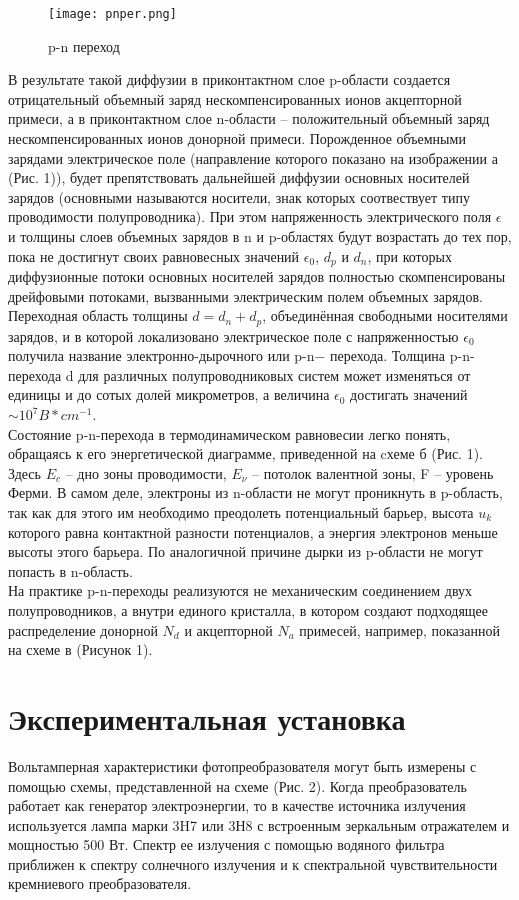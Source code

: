 \documentclass[a4paper,12pt]{article} %
\begin{document}
\begin{figure}[h]
		\centering	
		\texttt{[image: pnper.png]}
		\caption{p-n переход}
		\label{pic:scheme}
	\end{figure}

В результате такой диффузии в приконтактном слое p-области создается отрицательный объемный заряд нескомпенсированных ионов акцепторной примеси, а в приконтактном слое n-области – положительный объемный заряд нескомпенсированных ионов донорной примеси. Порожденное объемными зарядами электрическое поле (направление которого показано на изображении а (Рис. 1)), будет препятствовать дальнейшей диффузии основных носителей зарядов (основными называются носители, знак которых соотвествует типу проводимости полупроводника). При этом напряженность электрического поля $\epsilon$ и толщины слоев объемных зарядов в n и p-областях будут возрастать до тех пор, пока не достигнут своих равновесных значений $\epsilon_0$, $d_p$ и $d_n$, при которых диффузионные потоки основных носителей зарядов полностью скомпенсированы дрейфовыми потоками, вызванными электрическим полем объемных зарядов. Переходная область толщины $d=d_n+d_p$, объединённая свободными носителями зарядов, и в которой локализовано электрическое поле с напряженностью $\epsilon _0 $ получила название электронно-дырочного или p-n− перехода. Толщина p-n-перехода d для различных полупроводниковых систем может изменяться от единицы и до сотых долей микрометров, а величина $\epsilon_0$ достигать значений $\sim 10^7 B*cm^{-1}$.\\

Состояние p-n-перехода в термодинамическом равновесии легко понять, обращаясь к его энергетической диаграмме, приведенной на cхеме б (Рис. 1). Здесь $E_c$ – дно зоны проводимости, $E_\nu$ – потолок валентной зоны, F – уровень Ферми. В самом деле, электроны из n-области не могут проникнуть в p-область, так как для этого им необходимо преодолеть потенциальный барьер, высота $u_k$ которого равна контактной разности потенциалов, а энергия электронов меньше высоты этого барьера. По аналогичной причине дырки из p-области не могут попасть в n-область.\\

На практике p-n-переходы реализуются не механическим соединением двух полупроводников, а внутри единого кристалла, в котором создают подходящее распределение донорной $N_d$ и акцепторной $N_a$ примесей, например, показанной на схеме в (Рисунок 1).\\
\section{Экспериментальная установка}
Вольтамперная характеристики фотопреобразователя могут быть измерены с помощью схемы, представленной на схеме (Рис. 2). Когда преобразователь работает как генератор электроэнергии, то в качестве источника излучения используется лампа марки 3H7 или 3Н8 с встроенным зеркальным отражателем и мощностью 500 Вт. Спектр ее излучения с помощью водяного фильтра приближен к спектру солнечного излучения и к спектральной чувствительности кремниевого преобразователя.\\
\end{document}
